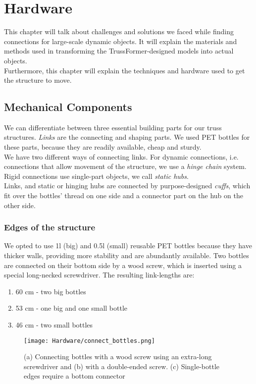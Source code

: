 \chapter{Hardware}\label{ch:hardware}
This chapter will talk about challenges and solutions we faced while finding connections for large-scale dynamic objects. It will explain the materials and methods used in transforming the TrussFormer-designed models into actual objects.\\
Furthermore, this chapter will explain the techniques and hardware used to get the structure to move.

\section{Mechanical Components}
We can differentiate between three essential building parts for our truss structures. \textit{Links} are the connecting and shaping parts. We used PET bottles for these parts, because they are readily available, cheap and sturdy.\\
We have two different ways of connecting links. For dynamic connections, i.e. connections that allow movement of the structure, we use a \textit{hinge chain} system. Rigid connections use single-part objects, we call \textit{static hubs}.\\
Links, and static or hinging hubs are connected by purpose-designed \textit{cuffs}, which fit over the bottles' thread on one side and a connector part on the hub on the other side.

\subsection{Edges of the structure}
We opted to use 1l (big) and 0.5l (small) reusable PET bottles because they have thicker walls, providing more stability and are abundantly available. Two bottles are connected on their bottom side by a wood screw, which is inserted using a special long-necked screwdriver. The resulting link-lengths are:
\begin{enumerate}
\item 60 cm - two big bottles
\item 53 cm - one big and one small bottle
\item 46 cm - two small bottles
\end{enumerate}

\begin{figure}[h!]
    \texttt{[image: Hardware/connect\_bottles.png]}
    \centering
    \caption{(a) Connecting bottles with a wood screw using an extra-long screwdriver and (b) with a double-ended screw. (c) Single-bottle edges require a bottom connector}
    \label{fig:connect_bottles}
\end{figure}

